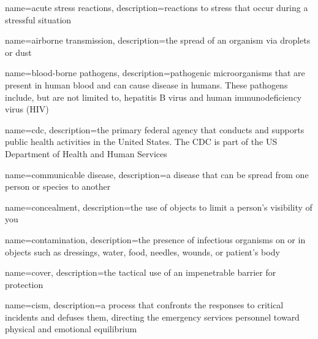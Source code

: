 \documentclass[../../EMT-169.tex]{subfiles}
\begin{document}
\setcounter{chapter}{1}
\label{ch:chapter2}
\clearpage
	
	
	
	{
		name=acute stress reactions,
		description={reactions to stress that occur during a stressful situation}
	}
	
	{
		name=airborne transmission,
		description={the spread of an organism via droplets or dust}
	}
	
	{
		name=blood-borne pathogens,
		description={pathogenic microorganisms that are present in human blood and can cause disease in humans.  These pathogens include, but are not limited to, hepatitis B virus and human immunodeficiency virus (HIV)}
	}
	
	{
		name=\acrfull{cdc},
		description={the primary federal agency that conducts and supports public health activities in the United States.  The CDC is part of the US Department of Health and Human Services}
	}
	
	{
		name=communicable disease,
		description={a disease that can be spread from one person or species to another}
	}
	
	{
		name=concealment,
		description={the use of objects to limit a person’s visibility of you}
	}
	
	{
		name=contamination,
		description={the presence of infectious organisms on or in objects such as dressings, water, food, needles, wounds, or patient’s body}
	}
	
	{
		name=cover,
		description={the tactical use of an impenetrable barrier for protection}
	}
	
	{
		name=\acrfull{cism},
		description={a process that confronts the responses to critical incidents and defuses them, directing the emergency services personnel toward physical and emotional equilibrium}
	}
	
\end{document}
